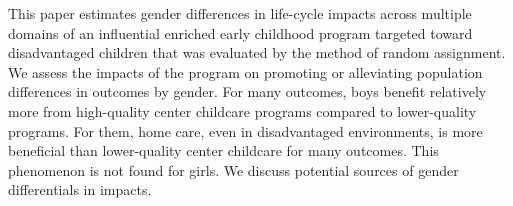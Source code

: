 \noindent This paper estimates gender differences in life-cycle impacts across multiple domains of an influential enriched early childhood program targeted toward disadvantaged children that was evaluated by the method of random assignment. We assess the impacts of the program on promoting or alleviating population differences in outcomes by gender. For many outcomes, boys benefit relatively more from high-quality center childcare programs compared to lower-quality programs. For them, home care, even in disadvantaged environments, is more beneficial than lower-quality center childcare for many outcomes. This phenomenon is not found for girls. We discuss potential sources of gender differentials in impacts. 